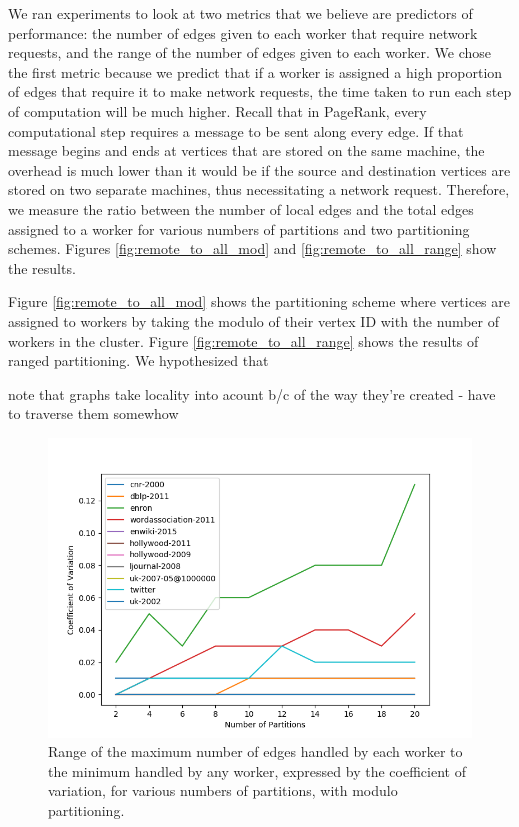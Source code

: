 We ran experiments to look at two metrics that we believe are predictors of 
performance: the number of edges given to each worker that require network 
requests, and the range of the number of edges given to each worker. We chose 
the first metric because we predict that if a worker is assigned a high 
proportion of edges that require it to make network requests, the time taken to 
run each step of computation will be much higher. Recall that in PageRank, 
every computational step requires a message to be sent along every edge. If 
that message begins and ends at vertices that are stored on the same machine, 
the overhead is much lower than it would be if the source and destination 
vertices are stored on two separate machines, thus necessitating a network 
request. Therefore, we measure the ratio between the number of local edges and 
the total edges assigned to a worker for various numbers of partitions and two 
partitioning schemes. Figures \ref{fig:remote_to_all_mod} and 
\ref{fig:remote_to_all_range} show the results.

Figure \ref{fig:remote_to_all_mod} shows the partitioning scheme where vertices 
are assigned to workers by taking the modulo of their vertex ID with the number 
of workers in the cluster. Figure \ref{fig:remote_to_all_range} shows the 
results of ranged partitioning. We hypothesized that 


note that graphs take locality into acount b/c of the way they're created - 
have to traverse them somewhow
\begin{figure}
	\centering
	\includegraphics[width=\columnwidth]{../good_plots/range_as_cv_modulo.png}
	\caption{Range of the maximum number of edges handled by each worker to the 
		minimum handled by any worker, expressed by the coefficient of 
		variation, 
		for various numbers of partitions, with modulo partitioning.}
	\label{fig:cv_mod}
\end{figure}

